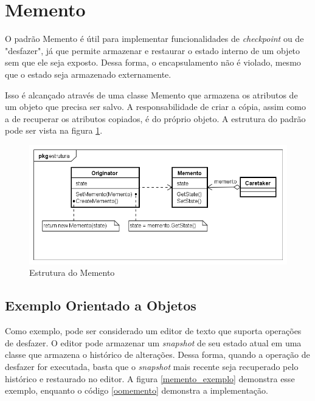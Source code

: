 \section{Memento}

O padrão Memento é útil para implementar funcionalidades 
de \textit{checkpoint} ou de "desfazer", já que permite 
armazenar e restaurar o estado interno de um objeto 
sem que ele seja exposto. Dessa forma, o encapsulamento 
não é violado, mesmo que o estado seja armazenado externamente.

Isso é alcançado através de uma classe Memento que armazena os 
atributos de um objeto que precisa ser salvo. A responsabilidade 
de criar a cópia, assim como a de recuperar os atributos copiados, 
é do próprio objeto. A estrutura do padrão pode ser vista 
na figura \ref{memento_struct}.

\begin{figure}[htb]
	\caption{\label{memento_struct}Estrutura do Memento}
	\begin{center}
	    \includegraphics[scale=0.5]{5_padroes-contexto-funcional/5.3_comportamentais/5.3.06_memento/memento_estrutura.png}
	\end{center}
\end{figure}

\subsection*{Exemplo Orientado a Objetos}

Como exemplo, pode ser considerado um editor de texto que 
suporta operações de desfazer. O editor pode armazenar um 
\textit{snapshot} de seu estado atual em uma classe que 
armazena o histórico de alterações. Dessa forma, quando a 
operação de desfazer for executada, basta que o 
\textit{snapshot} mais recente seja recuperado pelo histórico 
e restaurado no editor. A figura \ref{memento_exemplo} demonstra 
esse exemplo, enquanto o código \ref{oomemento} demonstra a 
implementação.

